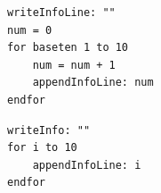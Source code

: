 \documentclass[12pt, english]{article}
\begin{document}
\begin{lstlisting}
writeInfoLine: ""
num = 0
for baseten 1 to 10
    num = num + 1
    appendInfoLine: num
endfor
\end{lstlisting}

\begin{lstlisting}[rulesepcolor=\color{blue}]
writeInfo: ""
for i to 10
    appendInfoLine: i
endfor
\end{lstlisting}

\vspace{10pt}

\end{document}
